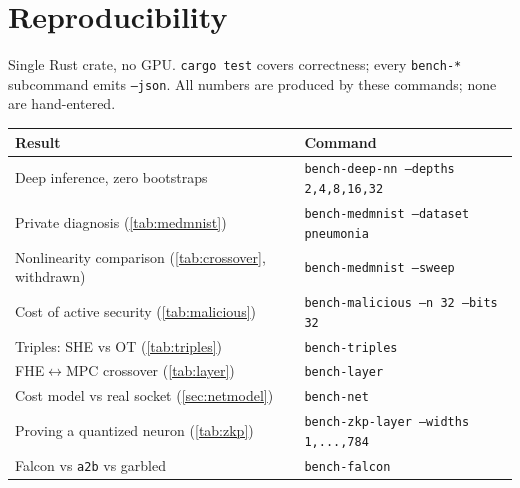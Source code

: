 \documentclass[11pt]{article}
\newcommand{\bt}[1]{\texttt{#1}}
\begin{document}

\section*{Reproducibility}

Single Rust crate, no GPU. \bt{cargo test} covers correctness; every
\bt{bench-*} subcommand emits \bt{--json}. All numbers are produced by these
commands; none are hand-entered.

\begin{center}
\small
\begin{tabular}{@{}ll@{}}
\toprule
Result & Command \\
\midrule
Deep inference, zero bootstraps & \bt{bench-deep-nn --depths 2,4,8,16,32} \\
Private diagnosis (\cref{tab:medmnist}) & \bt{bench-medmnist --dataset pneumonia} \\
Nonlinearity comparison (\cref{tab:crossover}, withdrawn) & \bt{bench-medmnist --sweep} \\
Cost of active security (\cref{tab:malicious}) & \bt{bench-malicious --n 32 --bits 32} \\
Triples: SHE vs OT (\cref{tab:triples}) & \bt{bench-triples} \\
FHE$\leftrightarrow$MPC crossover (\cref{tab:layer}) & \bt{bench-layer} \\
Cost model vs real socket (\cref{sec:netmodel}) & \bt{bench-net} \\
Proving a quantized neuron (\cref{tab:zkp}) & \bt{bench-zkp-layer --widths 1,...,784} \\
Falcon vs \bt{a2b} vs garbled & \bt{bench-falcon} \\
\bottomrule
\end{tabular}
\end{center}



\end{document}
